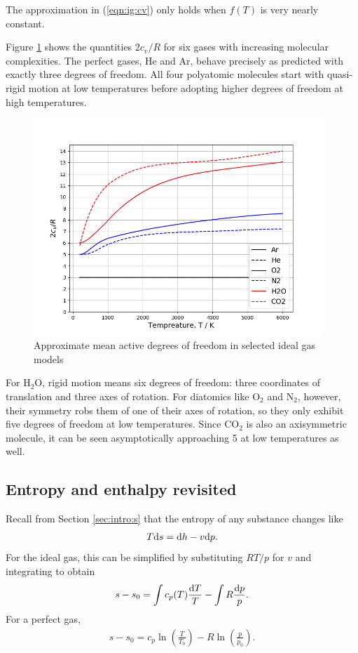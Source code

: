 The approximation in (\ref{eqn:ig:cv}) only holds when $f(T)$ is very nearly constant. 

Figure \ref{fig:dof} shows the quantities $2 c_v / R$ for six gases with increasing molecular complexities.  The perfect gases, He and Ar, behave precisely as predicted with exactly three degrees of freedom.  All four polyatomic molecules start with quasi-rigid motion at low temperatures before adopting higher degrees of freedom at high temperatures.

\begin{figure}
\centering
\includegraphics[width=0.97\textwidth]{figures/dof}
\caption{Approximate mean active degrees of freedom in selected ideal gas models}\label{fig:dof}
\end{figure}

For H$_2$O, rigid motion means six degrees of freedom: three coordinates of translation and three axes of rotation.  For diatomics like O$_2$ and N$_2$, however, their symmetry robs them of one of their axes of rotation, so they only exhibit five degrees of freedom at low temperatures.  Since CO$_2$ is also an axisymmetric molecule, it can be seen asymptotically approaching 5 at low temperatures as well.

\subsection{Entropy and enthalpy revisited}

Recall from Section \ref{sec:intro:s} that the entropy of any substance changes like
\begin{align}
T \mathrm{d} s = \mathrm{d} h - v \mathrm{d} p\nonumber.
\end{align}
For the ideal gas, this can be simplified by substituting $R T / p$ for $v$ and integrating to obtain
\begin{align}
s - s_0 = \int c_p(T)\frac{\mathrm{d} T}{T} - \int R \frac{\mathrm{d} p}{p}\label{eqn:ig:s}.
\end{align}
For a perfect gas,
\begin{align}
s - s_0 = c_p \ln\left( \frac{T}{T_0} \right) - R \ln\left( \frac{p}{p_0} \right)\label{eqn:pg:s}.
\end{align}

